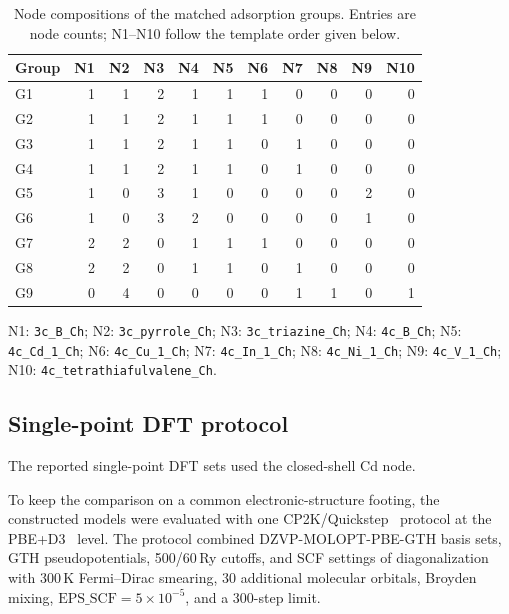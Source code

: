 \documentclass[a5paper, 10pt]{article}
\begin{document}
\begin{table}[H]
\centering\scriptsize
\setlength{\tabcolsep}{1.2mm}
\caption{Node compositions of the matched adsorption groups. Entries are node counts; N1--N10 follow the template order given below.}
\label{tab:adsorption_group_compositions}
\begin{tabular}{lrrrrrrrrrr}
\toprule
Group & N1 & N2 & N3 & N4 & N5 & N6 & N7 & N8 & N9 & N10 \\
\midrule
G1 & 1 & 1 & 2 & 1 & 1 & 1 & 0 & 0 & 0 & 0 \\
G2 & 1 & 1 & 2 & 1 & 1 & 1 & 0 & 0 & 0 & 0 \\
G3 & 1 & 1 & 2 & 1 & 1 & 0 & 1 & 0 & 0 & 0 \\
G4 & 1 & 1 & 2 & 1 & 1 & 0 & 1 & 0 & 0 & 0 \\
G5 & 1 & 0 & 3 & 1 & 0 & 0 & 0 & 0 & 2 & 0 \\
G6 & 1 & 0 & 3 & 2 & 0 & 0 & 0 & 0 & 1 & 0 \\
G7 & 2 & 2 & 0 & 1 & 1 & 1 & 0 & 0 & 0 & 0 \\
G8 & 2 & 2 & 0 & 1 & 1 & 0 & 1 & 0 & 0 & 0 \\
G9 & 0 & 4 & 0 & 0 & 0 & 0 & 1 & 1 & 0 & 1 \\
\bottomrule
\end{tabular}
\par\smallskip
\begin{minipage}{\linewidth}\raggedright\scriptsize
N1: \texttt{3c\_B\_Ch}; N2: \texttt{3c\_pyrrole\_Ch}; N3: \texttt{3c\_triazine\_Ch}; N4: \texttt{4c\_B\_Ch}; N5: \texttt{4c\_Cd\_1\_Ch}; N6: \texttt{4c\_Cu\_1\_Ch}; N7: \texttt{4c\_In\_1\_Ch}; N8: \texttt{4c\_Ni\_1\_Ch}; N9: \texttt{4c\_V\_1\_Ch}; N10: \texttt{4c\_tetrathiafulvalene\_Ch}.
\end{minipage}
\end{table}

\subsection{Single-point DFT protocol}
\label{app:dft_screening}

The reported single-point DFT sets used the closed-shell Cd node.

To keep the comparison on a common electronic-structure footing, the constructed models were evaluated with one CP2K/Quickstep~\cite{cp2k2020} protocol at the PBE+D3~\cite{perdew1996pbe,grimme2010d3} level. The protocol combined DZVP-MOLOPT-PBE-GTH basis sets, GTH pseudopotentials, 500/60\,Ry cutoffs, and SCF settings of diagonalization with 300\,K Fermi--Dirac smearing, 30 additional molecular orbitals, Broyden mixing, $\mathrm{EPS\_SCF}=5\times10^{-5}$, and a 300-step limit.
\end{document}

